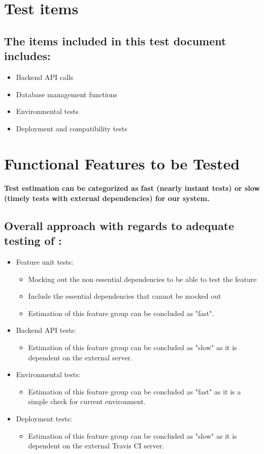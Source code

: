 \documentclass{article}
\begin{document}
\section{Test items}\label{sec:testItems}
\subsection{The items included in this test document includes:}
\begin{itemize}
	\item Backend API calls
	\item Database management functions
	\item Environmental tests 
	\item Deployment and compatibility tests
\end{itemize} 

\section{Functional Features to be Tested}\label{sec:FeaturesTest}
\paragraph{Test estimation can be categorized as fast (nearly instant tests) or slow (timely tests with external dependencies) for our system.} 
\subsection{Overall approach with regards to adequate testing of :} 
\begin{itemize}
\item Feature unit tests:
\begin{itemize}
	\item Mocking out the non essential dependencies to be able to test the feature
	\item Include the essential dependencies that cannot be mocked out
	\item Estimation of this feature group can be concluded as "fast".
\end{itemize}
\item Backend API tests:
\begin{itemize}
	\item Estimation of this feature group can be concluded as "slow" as it is dependent on the external server.
\end{itemize}
\item Environmental tests:
\begin{itemize}
	\item Estimation of this feature group can be concluded as "fast" as it is a simple check for current environment.
\end{itemize}
\item Deployment tests:
\begin{itemize}
	\item Estimation of this feature group can be concluded as "slow" as it is dependent on the external Travis CI server.
\end{itemize}
\end{itemize}
\end{document}
